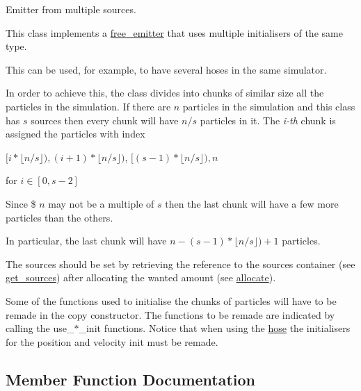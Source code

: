 Emitter from multiple sources. 

This class implements a \hyperlink{classphysim_1_1emitters_1_1free__emitter}{free\+\_\+emitter} that uses multiple initialisers of the same type.

This can be used, for example, to have several hoses in the same simulator.

In order to achieve this, the class divides into chunks of similar size all the particles in the simulation. If there are $n$ particles in the simulation and this class has $s$ sources then every chunk will have $n/s$ particles in it. The {\itshape i-\/th} chunk is assigned the particles with index

$[i*\lfloor n/s \rfloor), (i + 1)*\lfloor n/s \rfloor)$, $[(s - 1)*\lfloor n/s \rfloor), n$

for $i \in [0,s - 2] $

Since \$ $n$ may not be a multiple of $s$ then the last chunk will have a few more particles than the others.

In particular, the last chunk will have $n - (s - 1)*\lfloor n/s \rfloor) + 1$ particles.

The sources should be set by retrieving the reference to the sources container (see \hyperlink{classphysim_1_1emitters_1_1free__emitters_1_1multisource_aff534fc05593b50fcf710bf87be5490c}{get\+\_\+sources}) after allocating the wanted amount (see \hyperlink{classphysim_1_1emitters_1_1free__emitters_1_1multisource_ab1f79cb5a7f03279dca7f6b3aa98c903}{allocate}).

Some of the functions used to initialise the chunks of particles will have to be remade in the copy constructor. The functions to be remade are indicated by calling the use\+\_\+$\ast$\+\_\+init functions. Notice that when using the \hyperlink{classphysim_1_1emitters_1_1free__emitters_1_1hose}{hose} the initialisers for the position and velocity init must be remade. 

\subsection{Member Function Documentation}
\mbox{\label{classphysim_1_1emitters_1_1free__emitters_1_1multisource_ab1f79cb5a7f03279dca7f6b3aa98c903}} 
